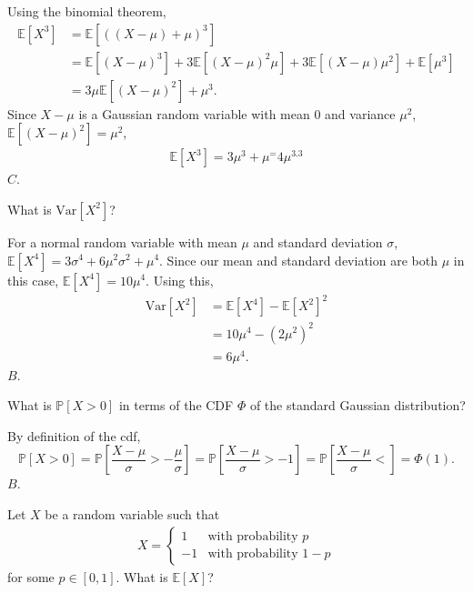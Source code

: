 \documentclass[a4paper]{article}
\begin{document}
\begin{Solution}
	Using the binomial theorem,
	\begin{align*}
		\mathbb{E}[X^3] &= \mathbb{E}[((X - \mu) + \mu)^3] 
			     \\ &= \mathbb{E}[(X - \mu)^3] + 3 \mathbb{E}[(X - \mu)^2 \mu] + 3\mathbb{E}[(X - \mu)\mu^2] + \mathbb{E}[\mu^3]
			     \\ &= 3 \mu \mathbb{E}[(X - \mu)^2] + \mu^3.
	\end{align*}
	Since $X - \mu$ is a Gaussian random variable with mean $0$ and variance $\mu^2$, $\mathbb{E}[(X - \mu)^2] = \mu^2$, 
	\begin{align*}
		\mathbb{E}[X^3] = 3 \mu^3 + \mu^ = 4 \mu^3.3
	\end{align*}
	$\boxed{C}$.
\end{Solution}
\begin{Exercise}
	What is $\text{Var}[X^2]$?
\end{Exercise}
\begin{Solution}
	For a normal random variable with mean $\mu$ and standard deviation $\sigma$, $\mathbb{E}[X^4] = 3 \sigma^4 + 6 \mu^2 \sigma^2 + \mu^4$. Since our mean and standard deviation are both $\mu$ in this case, $\mathbb{E}[X^4] = 10 \mu^4.$ Using this, 
	\begin{align*}
		\text{Var}[X^2] &= \mathbb{E}[X^4]- \mathbb{E}[X^2]^2
			     \\ &= 10 \mu^4 - (2 \mu^2)^2
			     \\ &= 6 \mu^4.
	\end{align*}
	$\boxed{B}$.
\end{Solution}
\begin{Exercise}
	What is $\mathbb{P}[X > 0]$ in terms of the CDF $\Phi$ of the standard Gaussian distribution?
\end{Exercise}
\begin{Solution}
	By definition of the cdf, $$\mathbb{P}[X > 0] = \mathbb{P} \left[ \frac{X - \mu}{\sigma} > -\frac{\mu}{\sigma} \right] = \mathbb{P} \left[ \frac{X - \mu}{\sigma} > -1 \right] = \mathbb{P} \left[ \frac{X - \mu}{\sigma} < \right] = \Phi(1).$$
	$\boxed{B}$.
\end{Solution}
\begin{Exercise}
	Let $X$ be a random variable such that
	\begin{align*}
		X = \begin{cases}
			1 & \text{with probability } p \\
			-1 & \text{with probability } 1- p
		\end{cases}
	\end{align*}
	for some $p \in [0, 1]$. What is $\mathbb{E}[X]$?
\end{Exercise}
\end{document}
